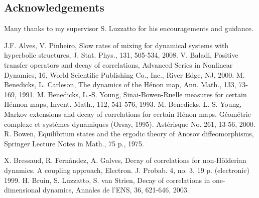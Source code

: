 \documentclass[a4paper,12pt]{amsart}
\numberwithin{equation}{section}
\begin{document}
\subsection*{Acknowledgements}Many thanks  to my supervisor S. Luzzatto for his
encouragements and guidance.

 

\begin{thebibliography}{99}
 J.F. Alves, V. Pinheiro, Slow rates of mixing for
dynamical systems with hyperbolic structures, J. Stat. Phys., 131,
505-534, 2008.
 V. Baladi, Positive transfer operators and
decay of correlations, Advanced Series in Nonlinear Dynamics, 16,
World Scientific Publishing Co., Inc., River Edge, NJ, 2000.
 M. Benedicks, L. Carleson, The dynamics of the H\'enon
map, Ann. Math., 133, 73-169, 1991.
 M. Benedicks, L.-S. Young, Sinai-Bowen-Ruelle measures
for certain H\'ennon maps, Invent. Math., 112, 541-576, 1993.
 M. Benedicks, L.-S. Young, Markov extensions and decay
of correlations for certain H\'enon maps. G\'eom\'etrie complexe et
syst\'emes dynamiques (Orsay, 1995). Ast\'erisque No. 261, 13-56,
2000.
 R. Bowen, Equilibrium states and the ergodic theory of Anosov diffeomorphisms,
Springer Lecture Notes in Math., 75 p., 1975.

 X. Bressaud, R. Fern\'andez, A. Galves,
Decay of correlations for non-H\"olderian dynamics. A coupling
approach, Electron. J. Probab. 4, no. 3, 19 p. (electronic) 1999.
 H. Bruin, S. Luzzatto, S. van Strien, Decay of correlations in one-dimensional dynamics,
Annales de l'ENS, 36, 621-646, 2003.


\end{thebibliography}
\end{document}
